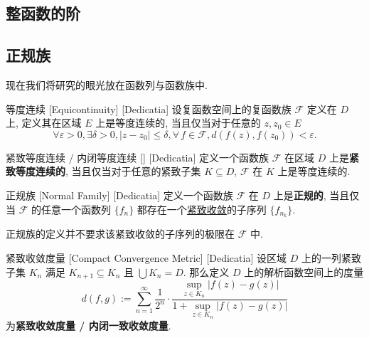     \subsection{整函数的阶}

    \subsection{正规族}

        现在我们将研究的眼光放在函数列与函数族中.

        \begin{dfn}
            [Equicontinuity]
            {等度连续}
            [Equicontinuity]
            [Dedicatia]
            设复函数空间上的复函数族 \(\mathcal{F}\) 定义在 \(D\) 上, 定义其在区域 \(E\) 上是等度连续的, 当且仅当对于任意的 \(z,z_0\in E\)
            \[\forall\varepsilon>0,\exists\delta>0, |z-z_0|\leq\delta, \forall\,f\in\mathcal{F}, d(f(z),f(z_0))<\varepsilon.\]
        \end{dfn}

        \begin{dfn}
            {紧致等度连续 / 内闭等度连续}
            []
            [Dedicatia]
            定义一个函数族 \(\mathcal{F}\) 在区域 \(D\) 上是\textbf{紧致等度连续的}, 当且仅当对于任意的紧致子集 \(K\subseteq D\), \(\mathcal{F}\) 在 \(K\) 上是等度连续的.
        \end{dfn}

        \begin{dfn}
            {正规族}
            [Normal Family]
            [Dedicatia]
            定义一个函数族 \(\mathcal{F}\) 在 \(D\) 上是\textbf{正规的}, 当且仅当 \(\mathcal{F}\) 的任意一个函数列 \(\{f_n\}\) 都存在一个\hyperref[dfn:Compact-Convergence]{紧致收敛}的子序列 \(\{f_{n_k}\}\). 
        \end{dfn}

        \begin{rmk}
            [Dedicatia]
            正规族的定义并不要求该紧致收敛的子序列的极限在 \(\mathcal{F}\) 中.
        \end{rmk}

        \begin{dfn}
            {紧致收敛度量}
            [Compact Convergence Metric]
            [Dedicatia]
            设区域 \(D\) 上的一列紧致子集 \(K_n\) 满足 \(K_{n+1}\subseteq K_n\) 且 \(\bigcup K_n=D\). 那么定义 \(D\) 上的解析函数空间上的度量
            \[d(f,g):=\sum_{n=1}^{\infty}\frac{1}{2^n}\cdot\frac{\sup\limits_{z\in K_n}|f(z)-g(z)|}{1+\sup\limits_{z\in K_n}|f(z)-g(z)|}\]
            为\textbf{紧致收敛度量 / 内闭一致收敛度量}.
        \end{dfn}

